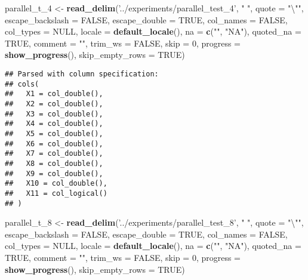 \documentclass[]{article}
\newenvironment{Shaded}{\begin{snugshade}}{\end{snugshade}}
\newcommand{\KeywordTok}[1]{\textcolor[rgb]{0.13,0.29,0.53}{\textbf{#1}}}
\newcommand{\DataTypeTok}[1]{\textcolor[rgb]{0.13,0.29,0.53}{#1}}
\newcommand{\DecValTok}[1]{\textcolor[rgb]{0.00,0.00,0.81}{#1}}
\newcommand{\CharTok}[1]{\textcolor[rgb]{0.31,0.60,0.02}{#1}}
\newcommand{\StringTok}[1]{\textcolor[rgb]{0.31,0.60,0.02}{#1}}
\newcommand{\OtherTok}[1]{\textcolor[rgb]{0.56,0.35,0.01}{#1}}
\newcommand{\NormalTok}[1]{#1}
\begin{document}
\begin{Shaded}
\begin{Highlighting}[]
\NormalTok{parallel_t_}\DecValTok{4}\NormalTok{ <-}\StringTok{ }\KeywordTok{read_delim}\NormalTok{(}\StringTok{'../experiments/parallel_test_4'}\NormalTok{, }\StringTok{" "}\NormalTok{, }\DataTypeTok{quote =} \StringTok{"}\CharTok{\textbackslash{}"}\StringTok{"}\NormalTok{, }\DataTypeTok{escape_backslash =} \OtherTok{FALSE}\NormalTok{,}
  \DataTypeTok{escape_double =} \OtherTok{TRUE}\NormalTok{, }\DataTypeTok{col_names =} \OtherTok{FALSE}\NormalTok{, }\DataTypeTok{col_types =} \OtherTok{NULL}\NormalTok{,}
  \DataTypeTok{locale =} \KeywordTok{default_locale}\NormalTok{(), }\DataTypeTok{na =} \KeywordTok{c}\NormalTok{(}\StringTok{""}\NormalTok{, }\StringTok{"NA"}\NormalTok{), }\DataTypeTok{quoted_na =} \OtherTok{TRUE}\NormalTok{,}
  \DataTypeTok{comment =} \StringTok{""}\NormalTok{, }\DataTypeTok{trim_ws =} \OtherTok{FALSE}\NormalTok{, }\DataTypeTok{skip =} \DecValTok{0}\NormalTok{, }
 \DataTypeTok{progress =} \KeywordTok{show_progress}\NormalTok{(),}
  \DataTypeTok{skip_empty_rows =} \OtherTok{TRUE}\NormalTok{)}
\end{Highlighting}
\end{Shaded}

\begin{verbatim}
## Parsed with column specification:
## cols(
##   X1 = col_double(),
##   X2 = col_double(),
##   X3 = col_double(),
##   X4 = col_double(),
##   X5 = col_double(),
##   X6 = col_double(),
##   X7 = col_double(),
##   X8 = col_double(),
##   X9 = col_double(),
##   X10 = col_double(),
##   X11 = col_logical()
## )
\end{verbatim}

\begin{Shaded}
\begin{Highlighting}[]
\NormalTok{parallel_t_}\DecValTok{8}\NormalTok{ <-}\StringTok{ }\KeywordTok{read_delim}\NormalTok{(}\StringTok{'../experiments/parallel_test_8'}\NormalTok{, }\StringTok{" "}\NormalTok{, }\DataTypeTok{quote =} \StringTok{"}\CharTok{\textbackslash{}"}\StringTok{"}\NormalTok{, }\DataTypeTok{escape_backslash =} \OtherTok{FALSE}\NormalTok{,}
  \DataTypeTok{escape_double =} \OtherTok{TRUE}\NormalTok{, }\DataTypeTok{col_names =} \OtherTok{FALSE}\NormalTok{, }\DataTypeTok{col_types =} \OtherTok{NULL}\NormalTok{,}
  \DataTypeTok{locale =} \KeywordTok{default_locale}\NormalTok{(), }\DataTypeTok{na =} \KeywordTok{c}\NormalTok{(}\StringTok{""}\NormalTok{, }\StringTok{"NA"}\NormalTok{), }\DataTypeTok{quoted_na =} \OtherTok{TRUE}\NormalTok{,}
  \DataTypeTok{comment =} \StringTok{""}\NormalTok{, }\DataTypeTok{trim_ws =} \OtherTok{FALSE}\NormalTok{, }\DataTypeTok{skip =} \DecValTok{0}\NormalTok{, }
 \DataTypeTok{progress =} \KeywordTok{show_progress}\NormalTok{(),}
  \DataTypeTok{skip_empty_rows =} \OtherTok{TRUE}\NormalTok{)}
\end{Highlighting}
\end{Shaded}
\end{document}
